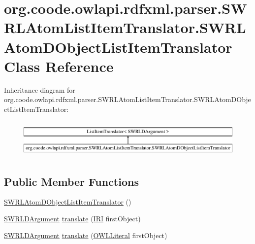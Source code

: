 \hypertarget{classorg_1_1coode_1_1owlapi_1_1rdfxml_1_1parser_1_1_s_w_r_l_atom_list_item_translator_1_1_s_w_r_0cbc2fa04ac3facd60666ca299f2b75d}{\section{org.\-coode.\-owlapi.\-rdfxml.\-parser.\-S\-W\-R\-L\-Atom\-List\-Item\-Translator.\-S\-W\-R\-L\-Atom\-D\-Object\-List\-Item\-Translator Class Reference}
\label{classorg_1_1coode_1_1owlapi_1_1rdfxml_1_1parser_1_1_s_w_r_l_atom_list_item_translator_1_1_s_w_r_0cbc2fa04ac3facd60666ca299f2b75d}
}
Inheritance diagram for org.\-coode.\-owlapi.\-rdfxml.\-parser.\-S\-W\-R\-L\-Atom\-List\-Item\-Translator.\-S\-W\-R\-L\-Atom\-D\-Object\-List\-Item\-Translator\-:\begin{figure}[H]
\begin{center}
\leavevmode
\includegraphics[height=1.961471cm]{classorg_1_1coode_1_1owlapi_1_1rdfxml_1_1parser_1_1_s_w_r_l_atom_list_item_translator_1_1_s_w_r_0cbc2fa04ac3facd60666ca299f2b75d}
\end{center}
\end{figure}
\subsection*{Public Member Functions}
\begin{DoxyCompactItemize}
\item 
\hyperlink{classorg_1_1coode_1_1owlapi_1_1rdfxml_1_1parser_1_1_s_w_r_l_atom_list_item_translator_1_1_s_w_r_0cbc2fa04ac3facd60666ca299f2b75d_ade85a4e1a6f3ff15af5e851337789156}{S\-W\-R\-L\-Atom\-D\-Object\-List\-Item\-Translator} ()
\item 
\hyperlink{interfaceorg_1_1semanticweb_1_1owlapi_1_1model_1_1_s_w_r_l_d_argument}{S\-W\-R\-L\-D\-Argument} \hyperlink{classorg_1_1coode_1_1owlapi_1_1rdfxml_1_1parser_1_1_s_w_r_l_atom_list_item_translator_1_1_s_w_r_0cbc2fa04ac3facd60666ca299f2b75d_a23e7cdcdd827b075265a50e70943a0e2}{translate} (\hyperlink{classorg_1_1semanticweb_1_1owlapi_1_1model_1_1_i_r_i}{I\-R\-I} first\-Object)
\item 
\hyperlink{interfaceorg_1_1semanticweb_1_1owlapi_1_1model_1_1_s_w_r_l_d_argument}{S\-W\-R\-L\-D\-Argument} \hyperlink{classorg_1_1coode_1_1owlapi_1_1rdfxml_1_1parser_1_1_s_w_r_l_atom_list_item_translator_1_1_s_w_r_0cbc2fa04ac3facd60666ca299f2b75d_a04fe874c047613e1ad3e8adc9dc4d7e2}{translate} (\hyperlink{interfaceorg_1_1semanticweb_1_1owlapi_1_1model_1_1_o_w_l_literal}{O\-W\-L\-Literal} first\-Object)
\end{DoxyCompactItemize}


